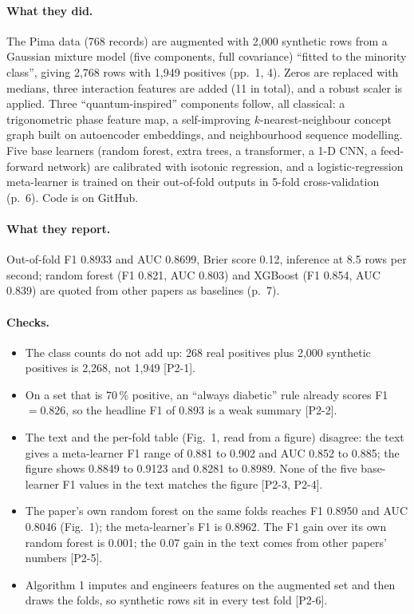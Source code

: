 \documentclass[11pt,a4paper]{article}
\newcommand{\chk}[1]{\textsf{\small [#1]}}
\begin{document}
\paragraph{What they did.} The Pima data (768 records) are augmented with 2,000 synthetic rows from a Gaussian mixture model (five components, full covariance) ``fitted to the minority class'', giving 2,768 rows with 1,949 positives (pp.~1, 4). Zeros are replaced with medians, three interaction features are added (11 in total), and a robust scaler is applied. Three ``quantum-inspired'' components follow, all classical: a trigonometric phase feature map, a self-improving $k$-nearest-neighbour concept graph built on autoencoder embeddings, and neighbourhood sequence modelling. Five base learners (random forest, extra trees, a transformer, a 1-D CNN, a feed-forward network) are calibrated with isotonic regression, and a logistic-regression meta-learner is trained on their out-of-fold outputs in 5-fold cross-validation (p.~6). Code is on GitHub.

\paragraph{What they report.} Out-of-fold F1 0.8933 and AUC 0.8699, Brier score 0.12, inference at 8.5 rows per second; random forest (F1 0.821, AUC 0.803) and XGBoost (F1 0.854, AUC 0.839) are quoted from other papers as baselines (p.~7).

\paragraph{Checks.}
\begin{itemize}
  \item The class counts do not add up: 268 real positives plus 2,000 synthetic positives is 2,268, not 1,949 \chk{P2-1}.
  \item On a set that is 70\,\% positive, an ``always diabetic'' rule already scores F1 $=0.826$, so the headline F1 of 0.893 is a weak summary \chk{P2-2}.
  \item The text and the per-fold table (Fig.~1, read from a figure) disagree: the text gives a meta-learner F1 range of 0.881 to 0.902 and AUC 0.852 to 0.885; the figure shows 0.8849 to 0.9123 and 0.8281 to 0.8989. None of the five base-learner F1 values in the text matches the figure \chk{P2-3, P2-4}.
  \item The paper's own random forest on the same folds reaches F1 0.8950 and AUC 0.8046 (Fig.~1); the meta-learner's F1 is 0.8962. The F1 gain over its own random forest is 0.001; the 0.07 gain in the text comes from other papers' numbers \chk{P2-5}.
  \item Algorithm 1 imputes and engineers features on the augmented set and then draws the folds, so synthetic rows sit in every test fold \chk{P2-6}.
\end{itemize}
\end{document}
